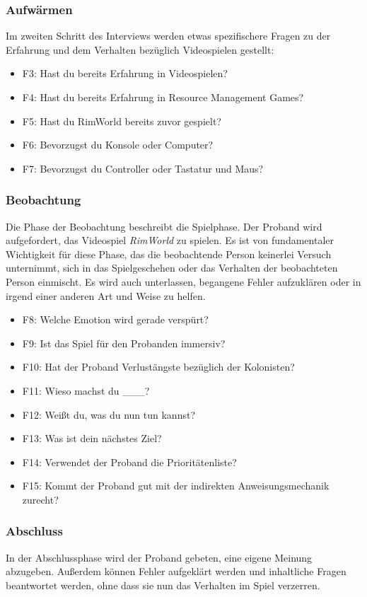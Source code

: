 \subsubsection{Aufwärmen}
Im zweiten Schritt des Interviews werden etwas spezifischere Fragen zu der Erfahrung und dem Verhalten bezüglich Videospielen gestellt:
\begin{itemize}
    \item F3: Hast du bereits Erfahrung in Videospielen?
    \item F4: Hast du bereits Erfahrung in Resource Management Games?
    \item F5: Hast du RimWorld bereits zuvor gespielt?
    \item F6: Bevorzugst du Konsole oder Computer?
    \item F7: Bevorzugst du Controller oder Tastatur und Maus?
\end{itemize}

\subsubsection{Beobachtung}
Die Phase der Beobachtung beschreibt die Spielphase. Der Proband wird aufgefordert, das Videospiel \textit{RimWorld} zu spielen. Es ist von fundamentaler Wichtigkeit für diese Phase, das die beobachtende Person keinerlei Versuch unternimmt, sich in das Spielgeschehen oder das Verhalten der beobachteten Person einmischt. Es wird auch unterlassen, begangene Fehler aufzuklären oder in irgend einer anderen Art und Weise zu helfen. 

\begin{itemize}
    \item F8: Welche Emotion wird gerade verspürt?
    \item F9: Ist das Spiel für den Probanden immersiv?
    \item F10: Hat der Proband Verlustängste bezüglich der Kolonisten?
    \item F11: Wieso machst du \_\_\_?
    \item F12: Weißt du, was du nun tun kannst?
    \item F13: Was ist dein nächstes Ziel?
    \item F14: Verwendet der Proband die Prioritätenliste?
    \item F15: Kommt der Proband gut mit der indirekten Anweisungsmechanik zurecht?
\end{itemize}

\subsubsection{Abschluss}
In der Abschlussphase wird der Proband gebeten, eine eigene Meinung abzugeben. Außerdem können Fehler aufgeklärt werden und inhaltliche Fragen beantwortet werden, ohne dass sie nun das Verhalten im Spiel verzerren.

